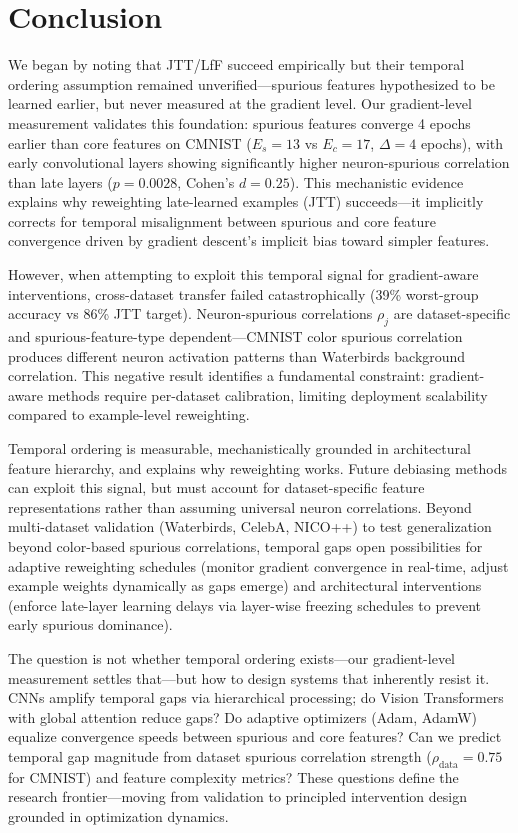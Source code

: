 \section{Conclusion}

We began by noting that JTT/LfF succeed empirically but their temporal ordering assumption remained unverified---spurious features hypothesized to be learned earlier, but never measured at the gradient level. Our gradient-level measurement validates this foundation: spurious features converge 4 epochs earlier than core features on CMNIST ($E_s=13$ vs $E_c=17$, $\Delta=4$ epochs), with early convolutional layers showing significantly higher neuron-spurious correlation than late layers ($p=0.0028$, Cohen's $d=0.25$). This mechanistic evidence explains why reweighting late-learned examples (JTT) succeeds---it implicitly corrects for temporal misalignment between spurious and core feature convergence driven by gradient descent's implicit bias toward simpler features.

However, when attempting to exploit this temporal signal for gradient-aware interventions, cross-dataset transfer failed catastrophically (39\% worst-group accuracy vs 86\% JTT target). Neuron-spurious correlations $\rho_j$ are dataset-specific and spurious-feature-type dependent---CMNIST color spurious correlation produces different neuron activation patterns than Waterbirds background correlation. This negative result identifies a fundamental constraint: gradient-aware methods require per-dataset calibration, limiting deployment scalability compared to example-level reweighting.

Temporal ordering is measurable, mechanistically grounded in architectural feature hierarchy, and explains why reweighting works. Future debiasing methods can exploit this signal, but must account for dataset-specific feature representations rather than assuming universal neuron correlations. Beyond multi-dataset validation (Waterbirds, CelebA, NICO++) to test generalization beyond color-based spurious correlations, temporal gaps open possibilities for adaptive reweighting schedules (monitor gradient convergence in real-time, adjust example weights dynamically as gaps emerge) and architectural interventions (enforce late-layer learning delays via layer-wise freezing schedules to prevent early spurious dominance).

The question is not whether temporal ordering exists---our gradient-level measurement settles that---but how to design systems that inherently resist it. CNNs amplify temporal gaps via hierarchical processing; do Vision Transformers with global attention reduce gaps? Do adaptive optimizers (Adam, AdamW) equalize convergence speeds between spurious and core features? Can we predict temporal gap magnitude from dataset spurious correlation strength ($\rho_{\text{data}}=0.75$ for CMNIST) and feature complexity metrics? These questions define the research frontier---moving from validation to principled intervention design grounded in optimization dynamics.

